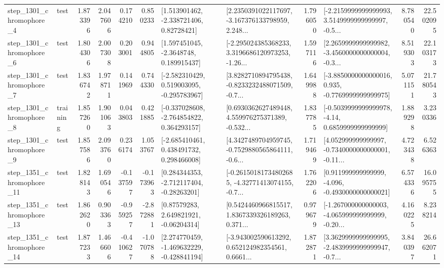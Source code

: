\begin{tabular}{llrrrrllrlrr}
  step\_1301\_chromophore\_4 &      test &      1.873396 &    2.047606 &      0.174210 &  0.850233 &     [1.513901462, -2.338721406, 0.82728421] &  [2.2350391022117697, -3.167376133798959, 2.248... &       1.796050 &  [-2.2159999999999993, 3.5149999999999997, -0.5... &            8.780540 &         22.502095 \\
  step\_1301\_chromophore\_6 &      test &      1.804306 &    2.007308 &      0.203001 &  0.944805 &      [1.597451045, -2.3648748, 0.189915437] &  [-2.295024385368233, 3.3196686120973253, -1.26... &       1.597116 &  [2.2659999999999982, -3.4560000000000004, -0.3... &            8.519303 &         22.103173 \\
  step\_1301\_chromophore\_7 &      test &      1.836742 &    1.978711 &      0.141969 &  0.744330 &   [-2.582310429, 0.519003095, -0.295783967] &  [3.8282710894795438, -0.8233232488071509, -0.7... &       1.649988 &  [-3.8850000000000016, 0.935, -0.7769999999999975] &            5.071151 &         21.780543 \\
  step\_1301\_chromophore\_8 &  training &      1.857260 &    1.901063 &      0.043803 &  0.421885 &   [-0.337028608, -2.764854822, 0.364293157] &  [0.6930362627489448, 4.559976275371389, -0.532... &       1.837785 &   [-0.5039999999999978, -4.14, 0.6859999999999999] &            1.889298 &          3.230336 \\
  step\_1301\_chromophore\_9 &      test &      1.857586 &    2.093760 &      0.236174 &  1.053767 &    [-2.685410461, 0.438491732, 0.298466008] &  [4.3427489704959745, -0.7529880565864111, -0.6... &       1.719469 &  [4.052999999999997, -0.7340000000000001, -0.11... &            4.723438 &          6.526363 \\
 step\_1351\_chromophore\_11 &      test &      1.828143 &    1.690546 &     -0.137597 & -0.173963 &    [0.284344353, -2.712117404, -0.28263201] &  [-0.26150181734802685, -4.32771413074155, -0.7... &       1.762206 &   [0.911999999999999, -4.096, -0.4930000000000021] &            6.574336 &         16.095755 \\
 step\_1351\_chromophore\_13 &      test &      1.862620 &    0.903363 &     -0.959257 & -2.872881 &      [0.87579283, 2.649821921, -0.06204314] &  [0.5424460966815517, 1.8367339326189263, 0.371... &       0.979679 &  [-1.267000000000003, -4.065999999999999, -0.20... &            4.160225 &          8.238214 \\
 step\_1351\_chromophore\_14 &      test &      1.877233 &    1.466606 &     -0.410627 & -1.070788 &   [2.274770459, -1.469632229, -0.428841194] &  [-3.943002590613292, 0.652124982354561, 0.6661... &       1.872871 &  [3.3629999999999995, -2.4839999999999947, -0.7... &            3.840397 &         26.662071 \\

\end{tabular}
